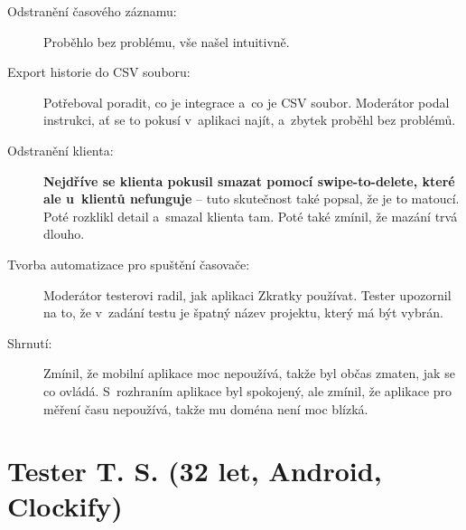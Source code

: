 \begin{description}
\item[Odstranění časového záznamu:] Proběhlo bez problému, vše našel intuitivně.
\item[Export historie do CSV souboru:] Potřeboval poradit, co je integrace a~co je CSV soubor. Moderátor podal instrukci, ať se to pokusí v~aplikaci najít, a~zbytek proběhl bez problémů.
\item[Odstranění klienta:] \textbf{Nejdříve se klienta pokusil smazat pomocí swipe-to-delete, které ale u~klientů nefunguje} – tuto skutečnost také popsal, že je to matoucí. Poté rozklikl detail a~smazal klienta tam. Poté také zmínil, že mazání trvá dlouho.
\item[Tvorba automatizace pro spuštění časovače:] Moderátor testerovi radil, jak aplikaci Zkratky používat. Tester upozornil na to, že v~zadání testu je špatný název projektu, který má být vybrán.
\item[Shrnutí:] Zmínil, že mobilní aplikace moc nepoužívá, takže byl občas zmaten, jak se co ovládá. S~rozhraním aplikace byl spokojený, ale zmínil, že aplikace pro měření času nepoužívá, takže mu doména není moc blízká.
\end{description}

\section*{Tester T. S. (32 let, Android, Clockify)}

